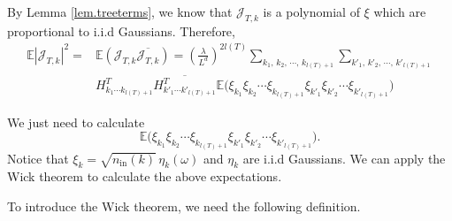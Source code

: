 

By Lemma \ref{lem.treeterms}, we know that $\mathcal{J}_{T,k}$ is a polynomial of $\xi$ which are proportional to i.i.d Gaussians. Therefore, 
\begin{equation}\label{eq.termexp1.threewave}
\begin{split}
    \mathbb{E}|\mathcal{J}_{T,k}|^2=&\mathbb{E}(\mathcal{J}_{T,k}\overline{\mathcal{J}_{T,k}})=\left(\frac{\lambda}{L^{d}}\right)^{2l(T)}
    \sum_{k_1,\, k_2,\, \cdots,\, k_{l(T)+1}}\sum_{k'_1,\, k'_2,\, \cdots,\, k'_{l(T)+1}}
    \\[0.5em]
    & H^T_{k_1\cdots k_{l(T)+1}} \overline{H^{T}_{k'_1\cdots k'_{l(T)+1}}}  \mathbb{E}\Big(\xi_{k_1}\xi_{k_2}\cdots\xi_{k_{l(T)+1}}\xi_{k'_1}\xi_{k'_2}\cdots\xi_{k'_{l(T)+1}}\Big)
\end{split}
\end{equation}

We just need to calculate 
\begin{equation}\label{eq.expectation''.threewave}
    \mathbb{E}\Big(\xi_{k_1}\xi_{k_2}\cdots\xi_{k_{l(T)+1}}
    \xi_{k'_1}\xi_{k'_2}\cdots\xi_{k'_{l(T)+1}}\Big).
\end{equation}
Notice that $\xi_k=\sqrt{n_{\textrm{in}}(k)} \, \eta_{k}(\omega)$ and $\eta_{k}$ are i.i.d Gaussians. We can apply the Wick theorem to calculate the above expectations. 

To introduce the Wick theorem, we need the following definition.

